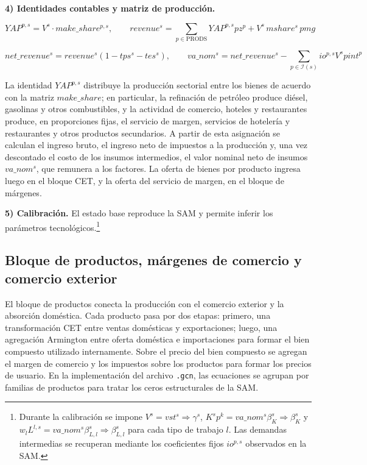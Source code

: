 \documentclass[11pt]{article}
\begin{document}
\textbf{4) Identidades contables y matriz de producción.}

\[
YAP^{p,s} = V^{s} \cdot make\_share^{p,s},
\qquad
revenue^{s} = \sum_{p \in \mathrm{PRODS}} YAP^{p,s} pz^{p}+V^{s}\, mshare^{s}\, pmg
\]

\[
net\_revenue^{s} = revenue^{s} \left(1-tps^{s}-tes^{s}\right),
\qquad
va\_nom^{s} = net\_revenue^{s} - \sum_{p \in \mathcal{I}(s)} io^{p,s} V^{s} pint^{p}
\]

La identidad \(YAP^{p,s}\) distribuye la producción sectorial entre los bienes de acuerdo con la matriz \(make\_share\); en particular, la refinación de petróleo produce diésel, gasolinas y otros combustibles, y la actividad de comercio, hoteles y restaurantes produce, en proporciones fijas, el servicio de margen, servicios de hotelería y restaurantes y otros productos secundarios. A partir de esta asignación se calculan el ingreso bruto, el ingreso neto de impuestos a la producción y, una vez descontado el costo de los insumos intermedios, el valor nominal neto de insumos \(va\_nom^{s}\), que remunera a los factores. La oferta de bienes por producto ingresa luego en el bloque CET, y la oferta del servicio de margen, en el bloque de márgenes.

\textbf{5) Calibración.} El estado base reproduce la SAM y permite inferir los parámetros tecnológicos.\footnote{Durante la calibración se impone \(V^{s}=vst^{s}\Rightarrow \gamma^{s}\), \(K^{s}p^{k}=va\_nom^{s}\beta_{K}^{s}\Rightarrow \beta_{K}^{s}\) y \(w_{l}L^{l,s}=va\_nom^{s}\beta_{L,l}^{s}\Rightarrow \beta_{L,l}^{s}\) para cada tipo de trabajo \(l\). Las demandas intermedias se recuperan mediante los coeficientes fijos \(io^{p,s}\) observados en la SAM.}

\subsection{Bloque de productos, márgenes de comercio y comercio exterior}
\label{sec:productos}

El bloque de productos conecta la producción con el comercio exterior y la absorción doméstica. Cada producto pasa por dos etapas: primero, una transformación CET entre ventas domésticas y exportaciones; luego, una agregación Armington entre oferta doméstica e importaciones para formar el bien compuesto utilizado internamente. Sobre el precio del bien compuesto se agregan el margen de comercio y los impuestos sobre los productos para formar los precios de usuario. En la implementación del archivo \texttt{.gcn}, las ecuaciones se agrupan por familias de productos para tratar los ceros estructurales de la SAM.
\end{document}
